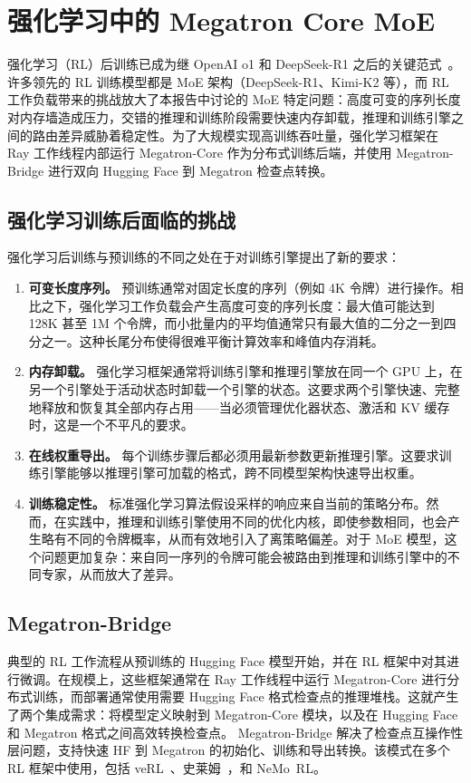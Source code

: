 \documentclass[10pt,logo,copyright]{nvidiatechreport_zh}
\begin{document}
\section{强化学习中的 Megatron Core MoE}\label{sec:rl}
强化学习（RL）后训练已成为继 OpenAI o1 和 DeepSeek-R1 之后的关键范式~\cite{deepseekai2025deepseekr1}。许多领先的 RL 训练模型都是 MoE 架构（DeepSeek-R1、Kimi-K2 等），而 RL 工作负载带来的挑战放大了本报告中讨论的 MoE 特定问题：高度可变的序列长度对内存墙造成压力，交错的推理和训练阶段需要快速内存卸载，推理和训练引擎之间的路由差异威胁着稳定性。为了大规模实现高训练吞吐量，强化学习框架在 Ray 工作线程内部运行 Megatron-Core 作为分布式训练后端，并使用 Megatron-Bridge 进行双向 Hugging Face 到 Megatron 检查点转换。

\subsection{强化学习训练后面临的挑战}
强化学习后训练与预训练的不同之处在于对训练引擎提出了新的要求：

\begin{enumerate}
    \item \textbf{可变长度序列。} 预训练通常对固定长度的序列（例如 4K 令牌）进行操作。相比之下，强化学习工作负载会产生高度可变的序列长度：最大值可能达到 128K 甚至 1M 个令牌，而小批量内的平均值通常只有最大值的二分之一到四分之一。这种长尾分布使得很难平衡计算效率和峰值内存消耗。
    \item \textbf{内存卸载。} 强化学习框架通常将训练引擎和推理引擎放在同一个 GPU 上，在另一个引擎处于活动状态时卸载一个引擎的状态。这要求两个引擎快速、完整地释放和恢复其全部内存占用——当必须管理优化器状态、激活和 KV 缓存时，这是一个不平凡的要求。
    \item \textbf{在线权重导出。} 每个训练步骤后都必须用最新参数更新推理引擎。这要求训练引擎能够以推理引擎可加载的格式，跨不同模型架构快速导出权重。
    \item \textbf{训练稳定性。} 标准强化学习算法假设采样的响应来自当前的策略分布。然而，在实践中，推理和训练引擎使用不同的优化内核，即使参数相同，也会产生略有不同的令牌概率，从而有效地引入了离策略偏差。对于 MoE 模型，这个问题更加复杂：来自同一序列的令牌可能会被路由到推理和训练引擎中的不同专家，从而放大了差异。
\end{enumerate}
\subsection{Megatron-Bridge}
典型的 RL 工作流程从预训练的 Hugging Face 模型开始，并在 RL 框架中对其进行微调。在规模上，这些框架通常在 Ray 工作线程中运行 Megatron-Core 进行分布式训练，而部署通常使用需要 Hugging Face 格式检查点的推理堆栈。这就产生了两个集成需求：将模型定义映射到 Megatron-Core 模块，以及在 Hugging Face 和 Megatron 格式之间高效转换检查点。 Megatron-Bridge 解决了检查点互操作性层问题，支持快速 HF 到 Megatron 的初始化、训练和导出转换。该模式在多个 RL 框架中使用，包括 veRL~\cite{sheng2024hybridflow}、史莱姆~\cite{slime_github}，和 NeMo~RL。
\end{document}
